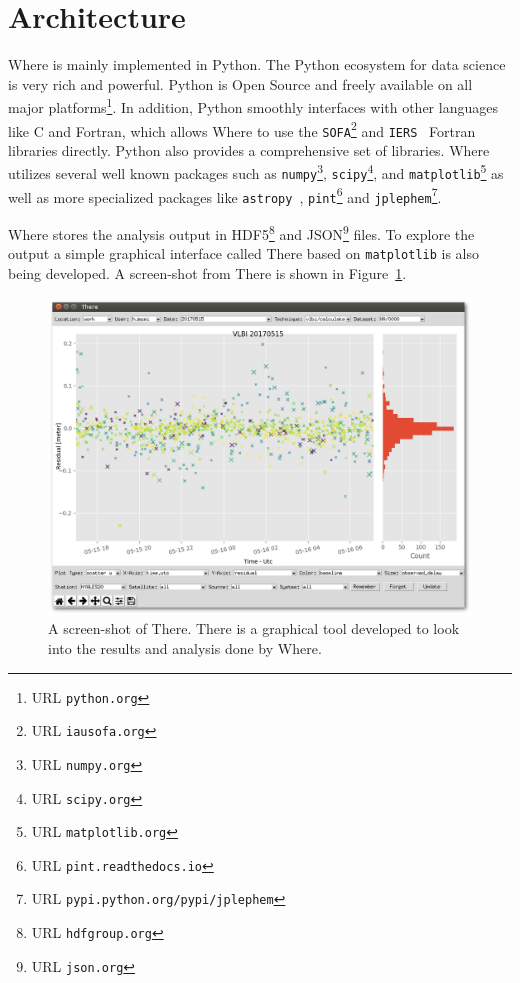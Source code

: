 \documentclass[natbib,twocolumn,twoside]{svmultiag}
\begin{document}
\section{Architecture}

Where is mainly implemented in Python. The Python ecosystem for data science is
very rich and powerful. Python is Open Source and freely available on all major
platforms\footnote{URL \texttt{python.org}}. In addition, Python smoothly
interfaces with other languages like C and Fortran, which allows Where to use
the \texttt{SOFA}\footnote{URL \texttt{iausofa.org}\label{ft:sofa}} and
\texttt{IERS}~\citep{iers_software} Fortran libraries directly. Python also
provides a comprehensive set of libraries. Where utilizes several well known
packages such as \texttt{numpy}\footnote{URL \texttt{numpy.org}},
\texttt{scipy}\footnote{URL \texttt{scipy.org}}, and
\texttt{matplotlib}\footnote{URL \texttt{matplotlib.org}} as well as more
specialized packages like \texttt{astropy}~\citep{astropy2013},
\texttt{pint}\footnote{URL \texttt{pint.readthedocs.io}} and
\texttt{jplephem}\footnote{URL
  \texttt{pypi.python.org/pypi/jplephem}\label{ft:jplephem}}.

Where stores the analysis output in HDF5\footnote{URL \texttt{hdfgroup.org}} and
JSON\footnote{URL \texttt{json.org}} files.  To explore the output a simple
graphical interface called There based on \texttt{matplotlib} is also being
developed. A screen-shot from There is shown in Figure~\ref{fig:there}.

\begin{figure}[tb]
  \includegraphics[width=\columnwidth]{kirkvik_fig01}
  \caption{A screen-shot of There. There is a graphical tool developed to look
    into the results and analysis done by Where.}
  \label{fig:there}
\end{figure}
\end{document}
